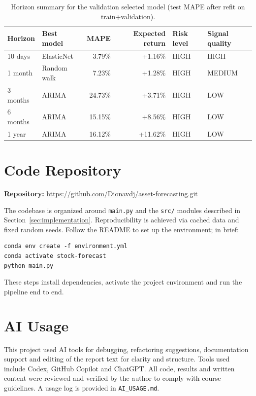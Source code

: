 \documentclass[11pt,a4paper]{article}
\begin{document}
\begin{table}[H]
\centering
\footnotesize
\setlength{\tabcolsep}{4pt}
\renewcommand{\arraystretch}{1.0}
\caption{Horizon summary for the validation selected model (test MAPE after refit on train+validation).}
\label{tab:diagnostic-summary}
\begin{tabular}{l l r r l l}
\toprule
Horizon & Best model & MAPE & Expected return & Risk level & Signal quality \\
\midrule
10 days  & ElasticNet & 3.79\% & +1.16\% & HIGH & HIGH \\
1 month  & Random walk & 7.23\% & +1.28\% & HIGH & MEDIUM \\
3 months & ARIMA & 24.73\% & +3.71\% & HIGH & LOW \\
6 months & ARIMA & 15.15\% & +8.56\% & HIGH & LOW \\
1 year   & ARIMA & 16.12\% & +11.62\% & HIGH & LOW \\
\bottomrule
\end{tabular}
\end{table}

\section{Code Repository}
\label{app:code}

\noindent
\textbf{Repository:} \url{https://github.com/Dionavdj/asset-forecasting.git}

\noindent
The codebase is organized around \texttt{main.py} and the \texttt{src/} modules described in Section~\ref{sec:implementation}. Reproducibility is achieved via cached data and fixed random seeds. Follow the README to set up the environment; in brief:
\begin{verbatim}
conda env create -f environment.yml
conda activate stock-forecast
python main.py
\end{verbatim}
These steps install dependencies, activate the project environment and run the pipeline end to end.

\section{AI Usage}
\label{app:ai}

This project used AI tools for debugging, refactoring suggestions, documentation support and editing of the report text for clarity and structure. Tools used include Codex, GitHub Copilot and ChatGPT. All code, results and written content were reviewed and verified by the author to comply with course guidelines. A usage log is provided in \texttt{AI\_USAGE.md}.
\end{document}
